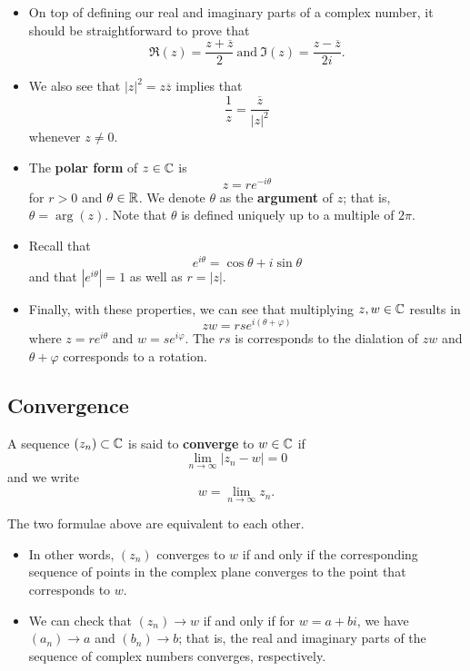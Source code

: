 \documentclass[11pt,a4paper]{book}
\begin{document}
\begin{itemize}
    \item On top of defining our real and imaginary parts of a complex number, it should be straightforward to prove that
        \[  \Re(z) = \frac{ z  + \overline{z} }{ 2  }  \ \text{and} \ \Im(z) = \frac{  z - \overline{z} }{ 2i }. \]
    \item We also see that \( | z |^{2} = z \overline{z} \) implies that
        \[  \frac{ 1 }{ z }  = \frac{ \overline{z} }{ | z |^{2} }  \]
        whenever \( z \neq 0  \).
    \item The \textbf{polar form} of \( z \in \mathbb{C}  \) is 
        \[  z = r e^{-i \theta} \]
        for \( r > 0  \) and \( \theta \in \mathbb{R}  \). We denote \( \theta  \) as the \textbf{argument} of \( z  \); that is, \( \theta = \arg(z) \). Note that \( \theta \) is defined uniquely up to a multiple of \( 2\pi \).
    \item Recall that
        \[  e^{i \theta} = \cos \theta + i \sin \theta \]
        and that \( | e^{i\theta} |  = 1  \) as well as \( r = | z  |  \).
    \item Finally, with these properties, we can see that multiplying \( z,w \in \mathbb{C}  \) results in
        \[  zw  = rs e^{i (\theta + \varphi)} \]
        where \( z = r e^{i\theta} \) and \( w = s e^{i \varphi} \). The \( rs  \) is corresponds to the dialation of \( zw  \) and \( \theta + \varphi \) corresponds to a rotation.
\end{itemize}

\subsection{Convergence}

\begin{definition}[Convergence in \( \C \)]
    A sequence \( ({z}_{n}) \subset \mathbb{C} \) is said to \textbf{converge} to \( w \in \mathbb{C}  \) if 
    \[ \lim_{ n \to \infty  }  | {z}_{n} - w  | = 0   \]
    and we write
    \[  w = \lim_{ n \to  \infty  } {z}_{n}. \]
\end{definition}
The two formulae above are equivalent to each other.

\begin{itemize}
    \item In other words, \( ({z}_{n})  \) converges to \( w  \) if and only if the corresponding sequence of points in the complex plane converges to the point that corresponds to \( w \). 
    \item We can check that \( ({z}_{n}) \to w  \) if and only if for \( w = a + bi  \), we have \( ({a}_{n}) \to a  \) and \( ({b}_{n}) \to b  \); that is, the real and imaginary parts of the sequence of complex numbers converges, respectively.
\end{itemize}
\end{document}
